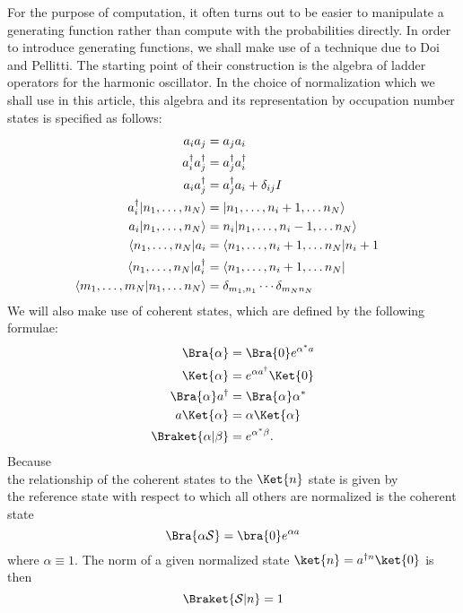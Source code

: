 For the purpose of computation, it often turns out to be easier to
manipulate a generating function rather than compute with the
probabilities directly.  In order to introduce generating functions, we
shall make use of a technique due to Doi and Pellitti.  The starting
point of their construction is the algebra of ladder operators for the
harmonic oscillator.  In the choice of normalization which we shall use
in this article, this algebra and its representation by occupation
number states is specified as follows:
\begin{align*}
a_i a_j &= a_j a_i \cr
a^\dagger_i a^\dagger_j &= a^\dagger_j a^\dagger_i \cr
a_i a^\dagger_j &= a^\dagger_j a_i + \delta_{ij} I \cr
a^\dagger_i |n_1, \ldots, n_N \rangle &=
|n_1, \ldots, n_i + 1, \ldots n_N \rangle \cr
a_i |n_1, \ldots, n_N \rangle &=
n_i |n_1, \ldots, n_i - 1, \ldots n_N \rangle \cr
\langle n_1, \ldots, n_N | a_i &=
\langle n_1, \ldots, n_i + 1, \ldots n_N | n_i +1 \cr
\langle n_1, \ldots, n_N | a^\dagger_i &=
\langle n_1, \ldots, n_i + 1, \ldots n_N | \cr
\langle m_1, \ldots, m_N | n_1, \ldots n_N \rangle &=
\delta_{m_1,n_1} \cdots \delta_{m_N n_N}
\end{align*}
We will also make use of coherent states, which are defined by the
following formulae:
\begin{align*}
\Bra{\alpha} &= \Bra{0} e^{\alpha^* a} \\
\Ket{\alpha} &= e^{\alpha a^{\dagger}} \Ket{0}\\
\Bra{\alpha}a^\dagger &= \Bra{\alpha}\alpha^*\\
a \Ket{\alpha} &= \alpha \Ket{\alpha}\\
\Braket{\alpha|\beta} &= e^{\alpha^* \beta}.
\end{align*}
Because
$$
$$
the relationship of the coherent states to the $\Ket{n}$ state is given by
$$
$$
the reference state with respect to which all others are normalized is the coherent state
$$\Bra{\alpha \mathcal{S}} = \bra{0}e^{\alpha a}$$
where $\alpha\equiv1$. The norm of a given normalized state $\ket{n}=a^{\dagger n} \ket{0}$ is then
$$\Braket{\mathcal{S}|n}=1$$


